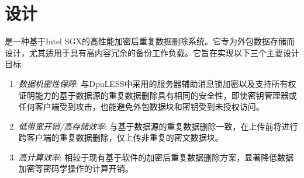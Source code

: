 \section{\sysnameS 设计}
\label{sec:sgxdedup-design}


\sysnameS 是一种基于Intel SGX的高性能加密后重复数据删除系统。它专为外包数据存储而设计，尤其适用于具有高内容冗余的备份工作负载。它旨在实现以下三个主要设计目标:
\begin{enumerate}
    \item \textit{数据机密性保障}: 与DpuLESS\cite{bellare13b}中采用的服务器辅助消息锁加密以及支持所有权证明\cite{halevi11}能力的基于数据源的重复数据删除具有相同的安全性，即使密钥管理器或任何客户端受到攻击，\sysnameS 也能避免外包数据块和密钥受到未授权访问。
    \item \textit{低带宽开销/高存储效率}: 与基于数据源的重复数据删除一致，\sysnameS 在上传前将进行跨客户端的重复数据删除，仅上传非重复的密文数据块。
    \item \textit{高计算效率}: 相较于现有基于软件的加密后重复数据删除方案，\sysnameS 显著降低数据加密等密码学操作的计算开销。
\end{enumerate}

